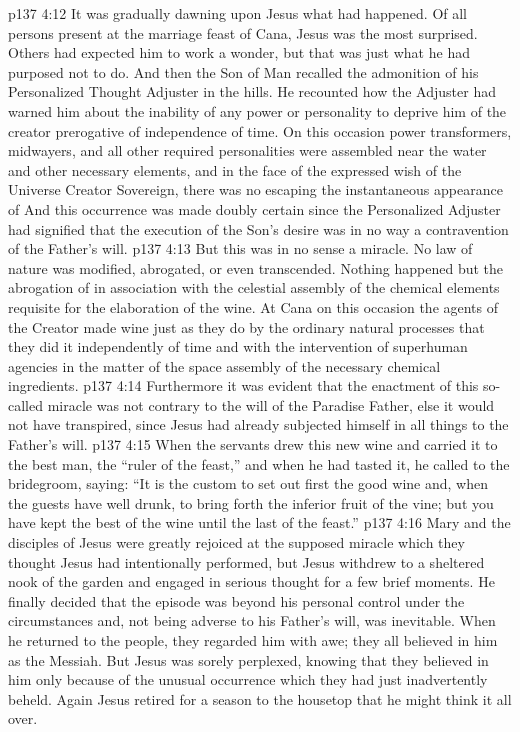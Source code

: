 \vs p137 4:12 It was gradually dawning upon Jesus what had happened. Of all persons present at the marriage feast of Cana, Jesus was the most surprised. Others had expected him to work a wonder, but that was just what he had purposed not to do. And then the Son of Man recalled the admonition of his Personalized Thought Adjuster in the hills. He recounted how the Adjuster had warned him about the inability of any power or personality to deprive him of the creator prerogative of independence of time. On this occasion power transformers, midwayers, and all other required personalities were assembled near the water and other necessary elements, and in the face of the expressed wish of the Universe Creator Sovereign, there was no escaping the instantaneous appearance of  And this occurrence was made doubly certain since the Personalized Adjuster had signified that the execution of the Son’s desire was in no way a contravention of the Father’s will.
\vs p137 4:13 But this was in no sense a miracle. No law of nature was modified, abrogated, or even transcended. Nothing happened but the abrogation of  in association with the celestial assembly of the chemical elements requisite for the elaboration of the wine. At Cana on this occasion the agents of the Creator made wine just as they do by the ordinary natural processes  that they did it independently of time and with the intervention of superhuman agencies in the matter of the space assembly of the necessary chemical ingredients.
\vs p137 4:14 Furthermore it was evident that the enactment of this so\hyp{}called miracle was not contrary to the will of the Paradise Father, else it would not have transpired, since Jesus had already subjected himself in all things to the Father’s will.
\pc \vs p137 4:15 When the servants drew this new wine and carried it to the best man, the “ruler of the feast,” and when he had tasted it, he called to the bridegroom, saying: “It is the custom to set out first the good wine and, when the guests have well drunk, to bring forth the inferior fruit of the vine; but you have kept the best of the wine until the last of the feast.”
\vs p137 4:16 Mary and the disciples of Jesus were greatly rejoiced at the supposed miracle which they thought Jesus had intentionally performed, but Jesus withdrew to a sheltered nook of the garden and engaged in serious thought for a few brief moments. He finally decided that the episode was beyond his personal control under the circumstances and, not being adverse to his Father’s will, was inevitable. When he returned to the people, they regarded him with awe; they all believed in him as the Messiah. But Jesus was sorely perplexed, knowing that they believed in him only because of the unusual occurrence which they had just inadvertently beheld. Again Jesus retired for a season to the housetop that he might think it all over.
